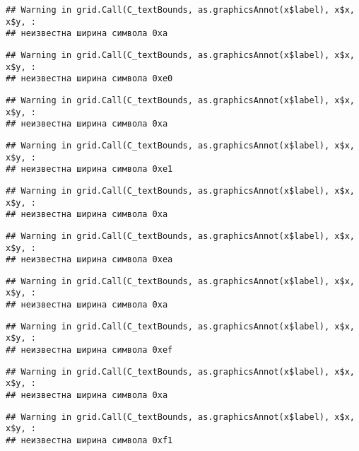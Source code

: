 \documentclass[
]{article}
\begin{document}
\begin{verbatim}
## Warning in grid.Call(C_textBounds, as.graphicsAnnot(x$label), x$x, x$y, :
## неизвестна ширина символа 0xa
\end{verbatim}

\begin{verbatim}
## Warning in grid.Call(C_textBounds, as.graphicsAnnot(x$label), x$x, x$y, :
## неизвестна ширина символа 0xe0
\end{verbatim}

\begin{verbatim}
## Warning in grid.Call(C_textBounds, as.graphicsAnnot(x$label), x$x, x$y, :
## неизвестна ширина символа 0xa
\end{verbatim}

\begin{verbatim}
## Warning in grid.Call(C_textBounds, as.graphicsAnnot(x$label), x$x, x$y, :
## неизвестна ширина символа 0xe1
\end{verbatim}

\begin{verbatim}
## Warning in grid.Call(C_textBounds, as.graphicsAnnot(x$label), x$x, x$y, :
## неизвестна ширина символа 0xa
\end{verbatim}

\begin{verbatim}
## Warning in grid.Call(C_textBounds, as.graphicsAnnot(x$label), x$x, x$y, :
## неизвестна ширина символа 0xea
\end{verbatim}

\begin{verbatim}
## Warning in grid.Call(C_textBounds, as.graphicsAnnot(x$label), x$x, x$y, :
## неизвестна ширина символа 0xa
\end{verbatim}

\begin{verbatim}
## Warning in grid.Call(C_textBounds, as.graphicsAnnot(x$label), x$x, x$y, :
## неизвестна ширина символа 0xef
\end{verbatim}

\begin{verbatim}
## Warning in grid.Call(C_textBounds, as.graphicsAnnot(x$label), x$x, x$y, :
## неизвестна ширина символа 0xa
\end{verbatim}

\begin{verbatim}
## Warning in grid.Call(C_textBounds, as.graphicsAnnot(x$label), x$x, x$y, :
## неизвестна ширина символа 0xf1
\end{verbatim}
\end{document}
